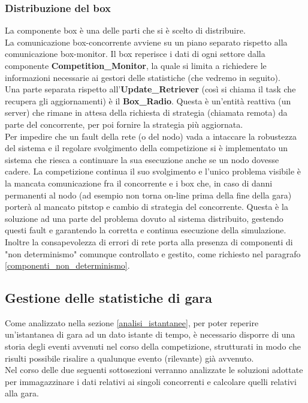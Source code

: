      \subsubsection{Distribuzione del box}
La componente box è una delle parti che si è scelto di distribuire.\\
La comunicazione box-concorrente avviene su un piano separato rispetto alla comunicazione box-monitor.
Il box reperisce i dati di ogni settore dalla componente \textbf{Competition\_Monitor}, la quale si limita
a richiedere le informazioni necessarie ai gestori delle statistiche (che vedremo in seguito).\\
Una parte separata rispetto all'\textbf{Update\_Retriever} (così si chiama il task che recupera gli aggiornamenti) è
il \textbf{Box\_Radio}. Questa è un'entità reattiva (un server) che rimane in attesa della richiesta di strategia (chiamata remota)
da parte del concorrente, per poi fornire la strategia più aggiornata.\\
Per impedire che un fault della rete (o del nodo) vada a intaccare la robustezza
del sistema e il regolare svolgimento della competizione si è implementato un sistema che riesca a continuare la
sua esecuzione anche se un nodo dovesse cadere. La competizione continua il suo
svolgimento e l'unico problema visibile è la mancata comunicazione fra il
concorrente e i box che, in caso di danni permanenti al nodo (ad esempio non
torna on-line prima della fine della gara) porterà al mancato pitstop e cambio
di strategia del concorrente. Questa è la soluzione ad una parte del problema
dovuto al sistema distribuito, gestendo questi fault e garantendo la corretta e
continua esecuzione della simulazione.
Inoltre la consapevolezza di errori di rete porta alla presenza di componenti di
"non determinismo" comunque controllato e gestito, come richiesto nel paragrafo
\ref{componenti_non_determinismo}.
\subsection{Gestione delle statistiche di gara}
\label{statistiche}
Come analizzato nella sezione \ref{analisi_istantanee}, per poter reperire
un'istantanea di gara ad un dato istante di tempo, è necessario
disporre di una storia degli eventi avvenuti nel corso della competizione,
strutturati in modo che risulti possibile risalire a qualunque evento
(rilevante) già avvenuto.\\ 
Nel corso delle due seguenti sottosezioni verranno analizzate le soluzioni
adottate per immagazzinare i dati relativi ai singoli concorrenti
e calcolare quelli relativi alla gara.
